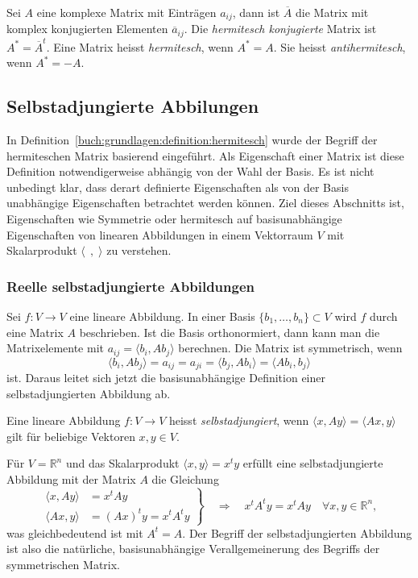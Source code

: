 \begin{definition}
\label{buch:grundlagen:definition:hermitesch}
Sei $A$ eine komplexe Matrix mit Einträgen $a_{i\!j}$, dann ist
$\overline{A}$ die Matrix mit komplex konjugierten Elementen
$\overline{a}_{i\!j}$.
Die {\em hermitesch konjugierte} Matrix ist $A^*=\overline{A}^t$.
%
Eine Matrix heisst {\em hermitesch}, wenn $A^*=A$.
%
Sie heisst {\em antihermitesch}, wenn $A^*=-A$.
\end{definition}

\subsection{Selbstadjungierte Abbilungen
\label{buch:subsection:selbstadjungiert}}
In Definition~\ref{buch:grundlagen:definition:hermitesch}
wurde der Begriff der hermiteschen Matrix basierend
eingeführt.
Als Eigenschaft einer Matrix ist diese Definition notwendigerweise
abhängig von der Wahl der Basis.
Es ist nicht unbedingt klar, dass derart definierte Eigenschaften
als von der Basis unabhängige Eigenschaften betrachtet werden können.
Ziel dieses Abschnitts ist, Eigenschaften wie Symmetrie oder
hermitesch auf basisunabhängige Eigenschaften von
linearen Abbildungen in einem Vektorraum $V$ mit Skalarprodukt
$\langle\;\,,\;\rangle$ zu verstehen.

\subsubsection{Reelle selbstadjungierte Abbildungen}
Sei $f\colon V\to V$ eine lineare Abbildung.
In einer Basis $\{b_1,\dots,b_n\}\subset V$ wird $f$ durch eine
Matrix $A$ beschrieben.
Ist die Basis orthonormiert, dann kann man die Matrixelemente 
mit $a_{i\!j}=\langle b_i,Ab_j\rangle$ berechnen.
Die Matrix ist symmetrisch, wenn 
\[
\langle b_i,Ab_j\rangle
=
a_{i\!j}
= 
a_{ji}
=
\langle b_j,Ab_i \rangle
=
\langle Ab_i,b_j \rangle
\]
ist.
Daraus leitet sich jetzt die basisunabhängige Definition einer
selbstadjungierten Abbildung ab.

\begin{definition}
Eine lineare Abbildung $f\colon V\to V$ heisst {\em selbstadjungiert}, wenn
$\langle x,Ay\rangle=\langle Ax,y\rangle$ gilt für beliebige 
Vektoren $x,y\in V$.
%
\end{definition}

Für $V=\mathbb{R}^n$ und das Skalarprodukt $\langle x,y\rangle=x^ty$ 
erfüllt eine selbstadjungierte Abbildung mit der Matrix $A$ die Gleichung
\[
\left.
\begin{aligned}
\langle x,Ay\rangle
&=
x^tAy
\\
\langle Ax,y\rangle
&=
(Ax)^ty=x^tA^ty
\end{aligned}
\right\}
\quad\Rightarrow\quad
x^tA^ty = x^tAy\quad\forall x,y\in\mathbb{R}^n,
\]
was gleichbedeutend ist mit $A^t=A$.
Der Begriff der selbstadjungierten Abbildung ist also die natürliche,
basisunabhängige
Verallgemeinerung des Begriffs der symmetrischen Matrix.

